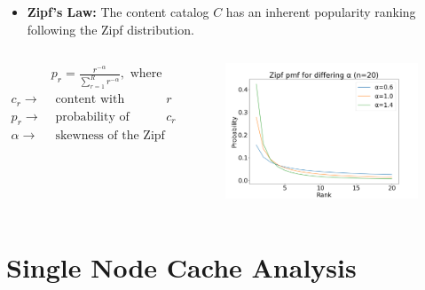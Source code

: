 \documentclass[
	xcolor={svgnames},
	hyperref={pagebackref,bookmarks},
	aspectratio=43,
]{beamer}
\begin{document}
\begin{frame}
    \begin{itemize}
        \item \textbf{Zipf's Law:} The content catalog $C$ has an inherent popularity ranking following the Zipf distribution\footnotemark.
    \end{itemize}
    \begin{columns}
        \begin{align*}
            &p_r = \frac{r^{-\alpha}}{\sum_{r=1}^{R} r^{-\alpha}}, \text{ where } \\
            c_r \rightarrow& \text{ content with popularity rank } r \\
            p_r \rightarrow& \text{ probability of requesting } c_r \\ 
            \alpha \rightarrow& \text{ skewness of the Zipf distribution}
        \end{align*}
        \begin{figure} \vspace*{-7mm}
            \centering
            \includegraphics[scale=0.2]{zipf.png}
        \end{figure}
    \end{columns}
\end{frame}

\section{Single Node Cache Analysis}
\end{document}
